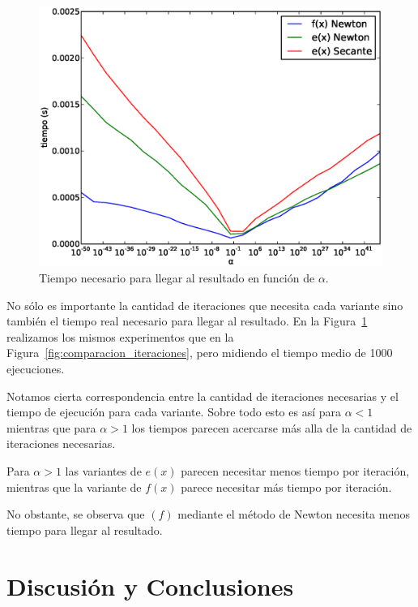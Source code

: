 \begin{figure}[!htbp]
  \begin{center}
    \includegraphics[scale=0.5]{graficos/new/comparacion_tiempos.eps}
    \caption{\label{fig:comparacion_tiempos} Tiempo necesario para llegar al resultado en función de $\alpha$.}
  \end{center}
\end{figure}

No sólo es importante la cantidad de iteraciones que necesita cada variante
sino también el tiempo real necesario para llegar al resultado. En la
Figura~\ref{fig:comparacion_tiempos} realizamos los mismos experimentos que en
la Figura~\ref{fig:comparacion_iteraciones}, pero midiendo el tiempo medio de
1000 ejecuciones.

Notamos cierta correspondencia entre la cantidad de iteraciones necesarias y el
tiempo de ejecución para cada variante. Sobre todo esto es así para $\alpha <
1$ mientras que para $\alpha > 1$ los tiempos parecen acercarse más alla de la
cantidad de iteraciones necesarias.

Para $\alpha > 1$ las variantes de $e(x)$ parecen necesitar menos tiempo por
iteración, mientras que la variante de $f(x)$ parece necesitar más tiempo por
iteración.

No obstante, se observa que $(f)$ mediante el método de Newton necesita menos
tiempo para llegar al resultado.

\newpage
\section{Discusión y Conclusiones}

